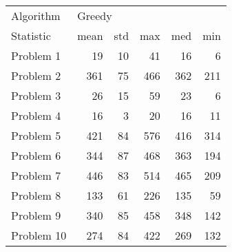 \begin{tabular}{lrrrrr}
\toprule
Algorithm & \multicolumn{5}{l}{Greedy} \\
Statistic &   mean & std &  max &  med &  min \\
\midrule
Problem 1  &     19 &  10 &   41 &   16 &    6 \\
Problem 2  &    361 &  75 &  466 &  362 &  211 \\
Problem 3  &     26 &  15 &   59 &   23 &    6 \\
Problem 4  &     16 &   3 &   20 &   16 &   11 \\
Problem 5  &    421 &  84 &  576 &  416 &  314 \\
Problem 6  &    344 &  87 &  468 &  363 &  194 \\
Problem 7  &    446 &  83 &  514 &  465 &  209 \\
Problem 8  &    133 &  61 &  226 &  135 &   59 \\
Problem 9  &    340 &  85 &  458 &  348 &  142 \\
Problem 10 &    274 &  84 &  422 &  269 &  132 \\
\bottomrule
\end{tabular}
